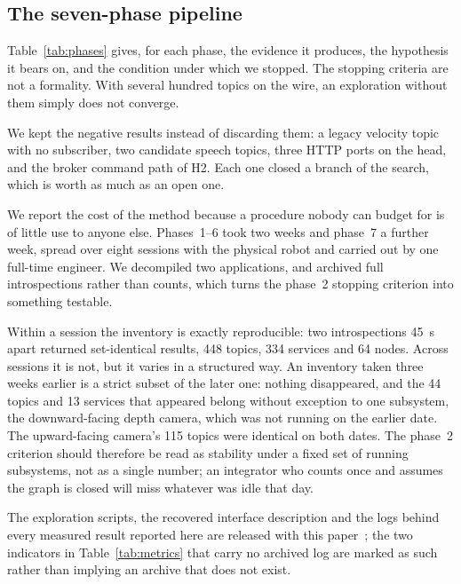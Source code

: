 

\subsection{The seven-phase pipeline}

Table~\ref{tab:phases} gives, for each phase, the evidence it produces, the hypothesis it bears
on, and the condition under which we stopped. The stopping criteria are not a formality. With
several hundred topics on the wire, an exploration without them simply does not converge.



We kept the negative results instead of discarding them: a legacy velocity topic with no
subscriber, two candidate speech topics, three HTTP ports on the head, and the broker command
path of H2. Each one closed a branch of the search, which is worth as much as an open one.

We report the cost of the method because a procedure nobody can budget for is of little use to
anyone else. Phases~1--6 took two weeks and phase~7 a further week, spread over eight sessions
with the physical robot and carried out by one full-time engineer. We decompiled two
applications, and archived full introspections rather than counts, which turns the phase~2
stopping criterion into something testable.

Within a session the inventory is exactly reproducible: two introspections \SI{45}{\second} apart
returned set-identical results, \num{448} topics, \num{334} services and \num{64} nodes. Across
sessions it is not, but it varies in a structured way. An inventory taken three weeks earlier is
a strict subset of the later one: nothing disappeared, and the \num{44} topics and \num{13}
services that appeared belong without exception to one subsystem, the downward-facing depth
camera, which was not running on the earlier date. The upward-facing camera's \num{115} topics
were identical on both dates. The phase~2 criterion should therefore be read as stability under a
fixed set of running subsystems, not as a single number; an integrator who counts once and
assumes the graph is closed will miss whatever was idle that day.

The exploration scripts, the recovered interface description and the
logs behind every measured result reported here are released with this
paper~\cite{cybel2026}; the two indicators in Table~\ref{tab:metrics} that carry no archived
log are marked as such rather than implying an archive that does not exist.
